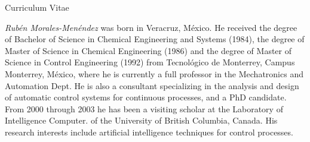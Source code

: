 \huge{Curriculum Vitae} \\
\normalsize
\vspace*{1.0 cm}

\emph{Rub\'{e}n Morales-Men\'{e}ndez} was born in Veracruz, M\'{e}xico. 
He received the degree of Bachelor of Science in Chemical Engineering 
and Systems (1984), the degree of Master of Science in Chemical 
Engineering (1986) and the degree of Master of Science in 
Control Engineering (1992) from Tecnológico de Monterrey, Campus
Monterrey, M\'{e}xico, where he is currently a full professor in the 
Mechatronics and Automation Dept. He is also a consultant 
specializing in the analysis and design of automatic 
control systems for continuous processes, and a PhD candidate.  
From 2000 through 
2003 he has been a visiting scholar at the Laboratory of Intelligence Computer. 
of the University of British Columbia, Canada. His research 
interests include artificial intelligence techniques for 
control processes.